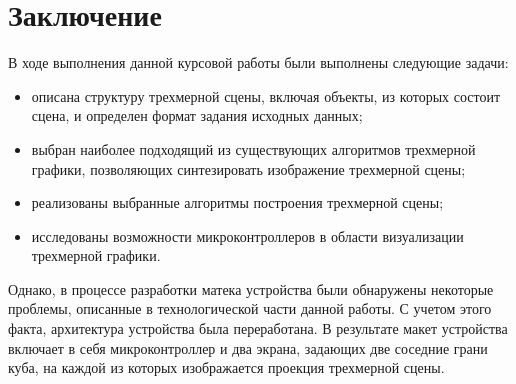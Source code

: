 \chapter*{Заключение}

В ходе выполнения данной курсовой работы были выполнены следующие задачи:
\begin{itemize}
    \item описана структуру трехмерной сцены, включая объекты, из которых состоит сцена, и определен формат задания исходных данных;
    \item выбран наиболее подходящий из существующих алгоритмов трехмерной графики, позволяющих синтезировать изображение трехмерной сцены;
    \item реализованы выбранные алгоритмы построения трехмерной сцены;
    \item исследованы возможности микроконтроллеров в области визуализации трехмерной графики.
\end{itemize}

Однако, в процессе разработки матека устройства были обнаружены некоторые проблемы, описанные в технологической части данной работы. С учетом этого факта, архитектура устройства была переработана. В результате макет устройства включает в себя микроконтроллер и два экрана, задающих две соседние грани куба, на каждой из которых изображается проекция трехмерной сцены.   

